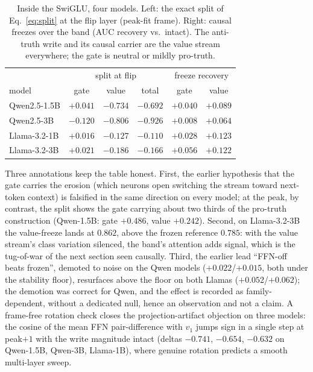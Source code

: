 \documentclass[11pt]{article}
\begin{document}
\begin{table}[H]
\centering
\caption{Inside the SwiGLU, four models. Left: the exact split of
Eq.~\ref{eq:split} at the flip layer (peak-fit frame). Right: causal
freezes over the band (AUC recovery vs.\ intact). The anti-truth write and
its causal carrier are the value stream everywhere; the gate is neutral or
mildly pro-truth.}
\label{tab:swiglu}
\begin{tabular}{lccccc}
\toprule
 & \multicolumn{3}{c}{split at flip} & \multicolumn{2}{c}{freeze recovery} \\
model & gate & value & total & gate & value \\
\midrule
Qwen2.5-1.5B & $+0.041$ & $-0.734$ & $-0.692$ & $+0.040$ & $+0.089$ \\
Qwen2.5-3B   & $-0.120$ & $-0.806$ & $-0.926$ & $+0.008$ & $+0.064$ \\
Llama-3.2-1B & $+0.016$ & $-0.127$ & $-0.110$ & $+0.028$ & $+0.123$ \\
Llama-3.2-3B & $+0.021$ & $-0.186$ & $-0.166$ & $+0.056$ & $+0.122$ \\
\bottomrule
\end{tabular}
\end{table}

Three annotations keep the table honest. First, the earlier hypothesis that
the gate carries the erosion (which neurons open switching the stream
toward next-token context) is falsified in the same direction on every
model; at the peak, by contrast, the split shows the gate carrying about
two thirds of the pro-truth construction (Qwen-1.5B: gate $+0.486$, value
$+0.242$). Second, on Llama-3.2-3B the value-freeze lands at $0.862$, above
the frozen reference $0.785$: with the value stream's class variation
silenced, the band's attention adds signal, which is the tug-of-war of the
next section seen causally. Third, the earlier lead ``FFN-off beats
frozen'', demoted to noise on the Qwen models ($+0.022$/$+0.015$, both
under the stability floor), resurfaces above the floor on both Llamas
($+0.052$/$+0.062$); the demotion was correct for Qwen, and the effect is
recorded as family-dependent, without a dedicated null, hence an
observation and not a claim. A frame-free rotation check closes the
projection-artifact objection on three models: the cosine of the mean FFN
pair-difference with $v_1$ jumps sign in a single step at peak$+1$ with the
write magnitude intact (deltas $-0.741$, $-0.654$, $-0.632$ on Qwen-1.5B,
Qwen-3B, Llama-1B), where genuine rotation predicts a smooth multi-layer
sweep.
\end{document}

